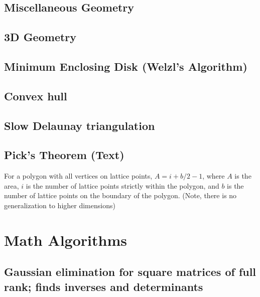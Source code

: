 \documentclass[9pt]{extarticle}
\begin{document}
\begin{multicols*}{3}
\subsection{Miscellaneous Geometry} %


\subsection{3D Geometry}


\subsection{Minimum Enclosing Disk (Welzl's Algorithm)} %


\subsection{Convex hull} %


\subsection{Slow Delaunay triangulation} %


\subsection{Pick's Theorem (Text)} %
For a polygon with all vertices on lattice points, $A = i + b/2 - 1$, where $A$
is the area, $i$ is the number of lattice points strictly within the polygon,
and $b$ is the number of lattice points on the boundary of the polygon. (Note,
there is no generalization to higher dimensions)

\section{Math Algorithms}

\subsection{Gaussian elimination for square matrices of full rank; finds
inverses and determinants} %



\end{multicols*}
\end{document}
